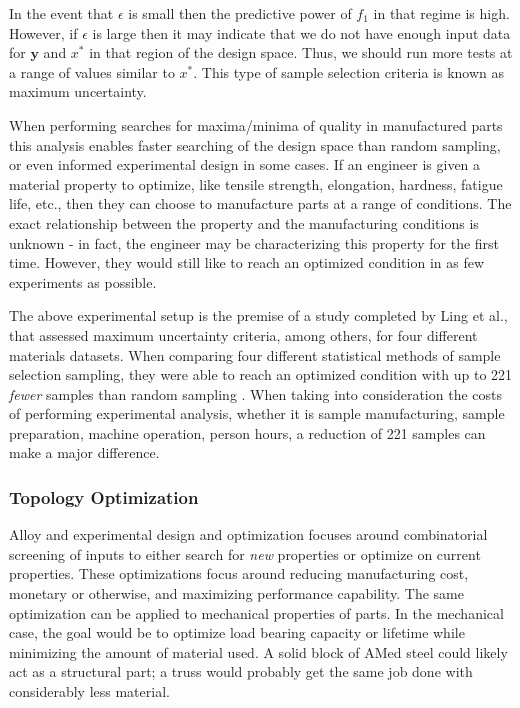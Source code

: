 In the event that $\epsilon$ is small then the predictive power of $f_1$ in that regime is high. However, if $\epsilon$ is large then it may indicate that we do not have enough input data for $\mathbf{y}$ and $x^*$ in that region of the design space. Thus, we should run more tests at a range of values similar to $x^*$. This type of sample selection criteria is known as maximum uncertainty. 

When performing searches for maxima/minima of quality in manufactured parts this analysis enables faster searching of the design space than random sampling, or even informed experimental design in some cases. If an engineer is given a material property to optimize, like tensile strength, elongation, hardness, fatigue life, etc., then they can choose to manufacture parts at a range of conditions. The exact relationship between the property and the manufacturing conditions is unknown - in fact, the engineer may be characterizing this property for the first time. However, they would still like to reach an optimized condition in as few experiments as possible. 

The above experimental setup is the premise of a study completed by Ling et al., that assessed maximum uncertainty criteria, among others, for four different materials datasets. When comparing four different statistical methods of sample selection sampling, they were able to reach an optimized condition with up to 221 \textit{fewer} samples than random sampling \cite{Ling2017}. When taking into consideration the costs of performing experimental analysis, whether it is sample manufacturing, sample preparation, machine operation, person hours, a reduction of 221 samples can make a major difference.

\subsubsection{Topology Optimization}
Alloy and experimental design and optimization focuses around combinatorial screening of inputs to either search for \textit{new} properties or optimize on current properties. These optimizations focus around reducing manufacturing cost, monetary or otherwise, and maximizing performance capability. The same optimization can be applied to mechanical properties of parts. In the mechanical case, the goal would be to optimize load bearing capacity or lifetime while minimizing the amount of material used. A solid block of AMed steel could likely act as a structural part; a truss would probably get the same job done with considerably less material.

